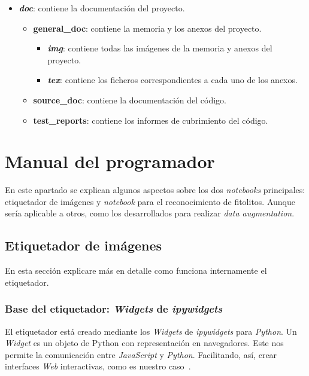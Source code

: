 \begin{itemize}
\begin{itemize}
		\item \textit{\textbf{doc}}: contiene la documentación del proyecto.
		\begin{itemize}
			\item \textbf{general\_doc}: contiene la memoria y los anexos del proyecto.
				\begin{itemize}
					\item \textit{\textbf{img}}: contiene todas las imágenes de la memoria y anexos del proyecto.
					\item \textit{\textbf{tex}}: contiene los ficheros correspondientes a cada uno de los anexos.
				\end{itemize}
			\item \textbf{source\_doc}: contiene la documentación del código.
			\item \textbf{test\_reports}: contiene los informes de cubrimiento del código.
		\end{itemize}
	\end{itemize}
\end{itemize}

\section{Manual del programador}

En este apartado se explican algunos aspectos sobre los dos \textit{notebooks} principales: etiquetador de imágenes y \textit{notebook} para el reconocimiento de fitolitos. Aunque sería aplicable a otros, como los desarrollados para realizar \textit{data augmentation}. 

\subsection{Etiquetador de imágenes}

En esta sección explicare más en detalle como funciona internamente el etiquetador.

\subsubsection{Base del etiquetador: \textit{Widgets} de \textit{ipywidgets}}

El etiquetador está creado mediante los \textit{Widgets} de \textit{ipywidgets} para \textit{Python}. Un \textit{Widget} es un objeto de Python con representación en navegadores. Este nos permite la comunicación entre \textit{JavaScript} y \textit{Python}. Facilitando, así, crear interfaces \textit{Web} interactivas, como es nuestro caso~\cite{ipywidgets:whataarewidgets}.

